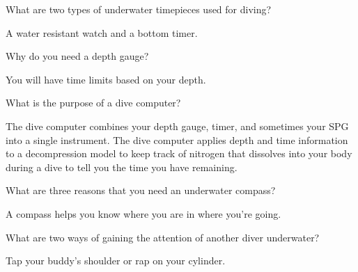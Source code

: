 	\begin{qanda}
		\begin{question}
What are two types of underwater timepieces used for diving?
		\end{question}

		\begin{answer}
A water resistant watch and a bottom timer.
		\end{answer}
	\end{qanda}

	\begin{qanda}
		\begin{question}
Why do you need a depth gauge?
		\end{question}

		\begin{answer}
You will have time limits based on your depth.
		\end{answer}
	\end{qanda}

	\begin{qanda}
		\begin{question}
What is the purpose of a dive computer?
		\end{question}

		\begin{answer}
The dive computer combines your depth gauge, timer, and sometimes your SPG into a single instrument.  The dive computer applies depth and time information to a decompression model to keep track of nitrogen that dissolves into your body during a dive to tell you the time you have remaining.
		\end{answer}
	\end{qanda}

	\begin{qanda}
		\begin{question}
What are three reasons that you need an underwater compass?
		\end{question}

		\begin{answer}
A compass helps you know where you are in where you're going.
		\end{answer}
	\end{qanda}

	\begin{qanda}
		\begin{question}
What are two ways of gaining the attention of another diver underwater?
		\end{question}

		\begin{answer}
Tap your buddy's shoulder or rap on your cylinder.
		\end{answer}
	\end{qanda}


